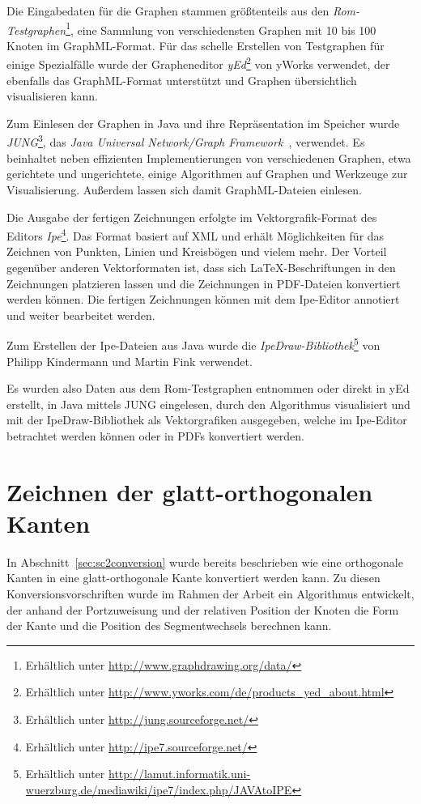 \documentclass[a4paper]{scrreprt}
\theoremstyle{definition}
\begin{document}
Die Eingabedaten für die Graphen stammen größtenteils aus den \emph{Rom-Testgraphen}\footnote{Erhältlich unter \url{http://www.graphdrawing.org/data/}}, eine Sammlung von verschiedensten Graphen mit 10 bis 100 Knoten im GraphML-Format. Für das schelle Erstellen von Testgraphen für einige Spezialfälle wurde der Grapheneditor \emph{yEd}\footnote{Erhältlich unter \url{http://www.yworks.com/de/products_yed_about.html}} von yWorks verwendet, der ebenfalls das GraphML-Format unterstützt und Graphen übersichtlich visualisieren kann.

Zum Einlesen der Graphen in Java und ihre Repräsentation im Speicher wurde \emph{JUNG}\footnote{Erhältlich unter \url{http://jung.sourceforge.net/}}, das \emph{Java Universal Network/Graph Framework}~\cite{jung}, verwendet. Es beinhaltet neben effizienten Implementierungen von verschiedenen Graphen, etwa gerichtete und ungerichtete, einige Algorithmen auf Graphen und Werkzeuge zur Visualisierung. Außerdem lassen sich damit GraphML-Dateien einlesen.

Die Ausgabe der fertigen Zeichnungen erfolgte im Vektorgrafik-Format des Editors \emph{Ipe}\footnote{Erhältlich unter \url{http://ipe7.sourceforge.net/}}. Das Format basiert auf XML und erhält Möglichkeiten für das Zeichnen von Punkten, Linien und Kreisbögen und vielem mehr. Der Vorteil gegenüber anderen Vektorformaten ist, dass sich \LaTeX-Beschriftungen in den Zeichnungen platzieren lassen und die Zeichnungen in PDF-Dateien konvertiert werden können. Die fertigen Zeichnungen können mit dem Ipe-Editor annotiert und weiter bearbeitet werden.

Zum Erstellen der Ipe-Dateien aus Java wurde die \emph{IpeDraw-Bibliothek}\footnote{Erhältlich unter \url{http://lamut.informatik.uni-wuerzburg.de/mediawiki/ipe7/index.php/JAVAtoIPE}} von Philipp Kindermann und Martin Fink verwendet.

Es wurden also Daten aus dem Rom-Testgraphen entnommen oder direkt in yEd erstellt, in Java mittels JUNG eingelesen, durch den Algorithmus visualisiert und mit der IpeDraw-Bibliothek als Vektorgrafiken ausgegeben, welche im Ipe-Editor betrachtet werden können oder in PDFs konvertiert werden.

\section{Zeichnen der glatt-orthogonalen Kanten}

In Abschnitt~\ref{sec:sc2conversion} wurde bereits beschrieben wie eine orthogonale Kanten in eine glatt-orthogonale Kante konvertiert werden kann. Zu diesen Konversionsvorschriften wurde im Rahmen der Arbeit ein Algorithmus entwickelt, der anhand der Portzuweisung und der relativen Position der Knoten die Form der Kante und die Position des Segmentwechsels berechnen kann. 
\end{document}
